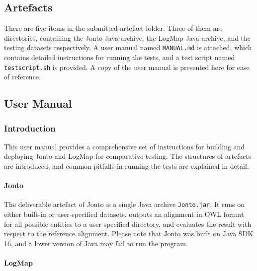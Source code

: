 \begin{appendices}


\chapter{Artefacts}

There are five items in the submitted artefact folder. Three of them are directories, containing the Jonto Java archive, the LogMap Java archive, and the testing datasets respectively. A user manual named \texttt{MANUAL.md} is attached, which contains detailed instructions for running the tests, and a test script named \texttt{testscript.sh} is provided. A copy of the user manual is presented here for ease of reference.

\section{User Manual}\label{user-manual}

\subsection{Introduction}\label{introduction}

This user manual provides a comprehensive set of instructions for
building and deploying Jonto and LogMap for comparative testing. The
structures of artefacts are introduced, and common pitfalls in running
the tests are explained in detail.

\subsubsection{Jonto}\label{jonto}

The deliverable artefact of Jonto is a single Java archive
\texttt{Jonto.jar}. It runs on either built-in or user-specified
datasets, outputs an alignment in OWL format for all possible entities
to a user specified directory, and evaluates the result with respect to
the reference alignment. Please note that Jonto was built on Java SDK
16, and a lower version of Java may fail to run the program.

\subsubsection{LogMap}\label{logmap}


\end{appendices}
